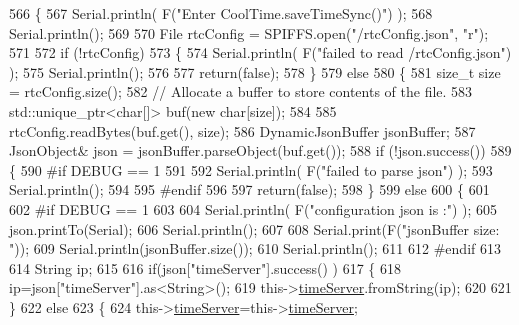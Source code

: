 \begin{DoxyCode}
566 \{
567     Serial.println( F(\textcolor{stringliteral}{"Enter CoolTime.saveTimeSync()"}) );
568     Serial.println();
569 
570     File rtcConfig = SPIFFS.open(\textcolor{stringliteral}{"/rtcConfig.json"}, \textcolor{stringliteral}{"r"});
571 
572     \textcolor{keywordflow}{if} (!rtcConfig) 
573     \{
574         Serial.println( F(\textcolor{stringliteral}{"failed to read /rtcConfig.json"}) );
575         Serial.println();
576 
577         \textcolor{keywordflow}{return}(\textcolor{keyword}{false});
578     \}
579     \textcolor{keywordflow}{else}
580     \{
581         \textcolor{keywordtype}{size\_t} size = rtcConfig.size();
582         \textcolor{comment}{// Allocate a buffer to store contents of the file.}
583         std::unique\_ptr<char[]> buf(\textcolor{keyword}{new} \textcolor{keywordtype}{char}[size]);
584 
585         rtcConfig.readBytes(buf.get(), size);
586         DynamicJsonBuffer jsonBuffer;
587         JsonObject& json = jsonBuffer.parseObject(buf.get());
588         \textcolor{keywordflow}{if} (!json.success()) 
589         \{
590 \textcolor{preprocessor}{        #if DEBUG == 1}
591 
592             Serial.println( F(\textcolor{stringliteral}{"failed to parse json"}) );
593             Serial.println();
594         
595 \textcolor{preprocessor}{        #endif}
596 
597             \textcolor{keywordflow}{return}(\textcolor{keyword}{false});
598         \} 
599         \textcolor{keywordflow}{else}
600         \{
601 
602 \textcolor{preprocessor}{        #if DEBUG == 1}
603     
604             Serial.println( F(\textcolor{stringliteral}{"configuration json is :"}) );
605             json.printTo(Serial);
606             Serial.println();
607 
608             Serial.print(F(\textcolor{stringliteral}{"jsonBuffer size: "}));
609             Serial.println(jsonBuffer.size());
610             Serial.println();
611 
612 \textcolor{preprocessor}{        #endif}
613 
614             String ip;
615                     
616             \textcolor{keywordflow}{if}(json[\textcolor{stringliteral}{"timeServer"}].success() )
617             \{           
618                  ip=json[\textcolor{stringliteral}{"timeServer"}].as<String>();
619                 this->\hyperlink{classCoolTime_ad2b9858f399108cb440dd1e908916f04}{timeServer}.fromString(ip);
620                 
621             \}
622             \textcolor{keywordflow}{else}
623             \{
624                 this->\hyperlink{classCoolTime_ad2b9858f399108cb440dd1e908916f04}{timeServer}=this->\hyperlink{classCoolTime_ad2b9858f399108cb440dd1e908916f04}{timeServer};

\end{DoxyCode}
